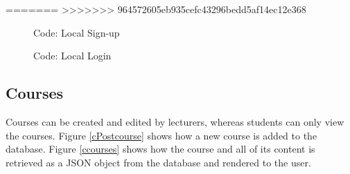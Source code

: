 \documentclass[a4paper,12pt]{article}
\numberwithin{equation}{section} %
\numberwithin{figure}{section}
\begin{document}
=======
>>>>>>> 964572605eb935cefc43296bedd5af14ec12e368


\begin{figure}[H]
\centering
{}
\caption{Code: Local Sign-up}
\label{cLocalSignup}
\end{figure}

\begin{figure}[H]
\centering
{}
\caption{Code: Local Login}
\label{cLocallogin}
\end{figure}

\subsection{Courses}
Courses can be created and edited by lecturers, whereas students can only view the courses. Figure \ref{cPostcourse} shows how a new course is added to the database. Figure \ref{ccourses} shows how the course and all of its content is retrieved as a JSON object from the database and rendered to the user.
\end{document}
